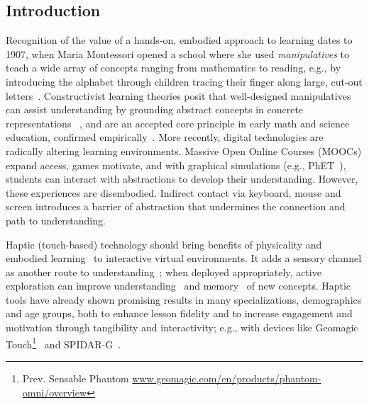 %
\subsection{Introduction}
Recognition of the value of a hands-on, embodied approach to learning dates to 1907, when
Maria Montessori opened a school where she used \emph{manipulatives} to teach a wide array of concepts ranging from mathematics to reading, e.g., by introducing the alphabet through children tracing their finger along large, cut-out letters~\cite{Montessori1917}.
Constructivist learning theories posit that well-designed manipulatives can assist understanding by grounding abstract concepts in concrete representations ~\cite{Papert1980,piaget_science_1970},
and are an accepted core principle in early math and science education, confirmed empirically~\cite{Carbonneau2013}. 
More recently, digital technologies are radically altering learning environments.
Massive Open Online Courses (MOOCs) expand access, games motivate, and with graphical simulations (e.g., PhET~\cite{wieman_phet:_2008}), students can interact with abstractions to develop their understanding.
However, these experiences are disembodied. Indirect contact via keyboard, mouse and screen introduces a barrier of abstraction that undermines the connection and path to understanding. 


Haptic (touch-based) technology should bring %
 benefits of physicality and embodied learning~\cite{dourish_where_2004} to interactive virtual environments. 
It adds a sensory channel as another route to understanding~\cite{calvert_crossmodal_1998}; when deployed appropriately, active exploration can improve understanding~\cite{martin_physically_2005} and memory~\cite{glenberg_activity_2004} of new concepts. 
Haptic tools have already shown promising results in many specializations, demographics and age groups, both
to enhance lesson fidelity 
and to increase engagement and motivation through tangibility and interactivity; e.g., with devices like Geomagic Touch\footnote{Prev. Sensable Phantom \url{www.geomagic.com/en/products/phantom-omni/overview}}~\cite{williams_implementation_2004} and SPIDAR-G~\cite{sato_haptic_2008}.

